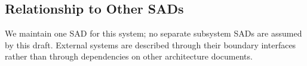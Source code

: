 \subsection{Relationship to Other SADs}
\label{sec:other-sads}
\begin{notapplicable}
We maintain one SAD for this system; no separate subsystem SADs are assumed by this
draft. External systems are described through their boundary interfaces rather than
through dependencies on other architecture documents.
\end{notapplicable}
